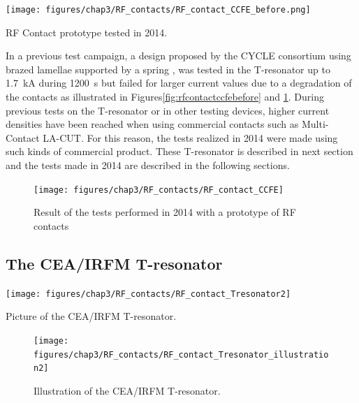 {\begin{marginfigure}[-2cm]
	\centering
	\texttt{[image: figures/chap3/RF\_contacts/RF\_contact\_CCFE\_before.png]}
	\caption{RF Contact prototype tested in 2014.}
	\label{fig:rfcontactccfebefore}
\end{marginfigure}

In a previous test campaign, a design proposed by the CYCLE consortium using brazed lamellae supported by a spring \cite{argouarch2014}, was tested in the T-resonator up to 1.7~kA during 1200~s but failed for larger current values due to a degradation of the contacts as illustrated in Figures\ref{fig:rfcontactccfebefore} and \ref{fig:rfcontactccfe}\cite{hillairet2015-1}. During previous tests on the T-resonator or in other testing devices, higher current densities have been reached when using commercial contacts such as Multi-Contact LA-CUT\cite{argouarch2013}. For this reason, the tests realized in 2014 were made using such kinds of commercial product. These T-resonator is described in next section and the tests made in 2014 are described in the following sections.

\begin{figure}[h]
	\centering
	\texttt{[image: figures/chap3/RF\_contacts/RF\_contact\_CCFE]}
	\caption{Result of the tests performed in 2014 with a prototype of RF contacts}
	\label{fig:rfcontactccfe}
\end{figure}

\clearpage
\subsection{The CEA/IRFM T-resonator}

\begin{marginfigure}
	\centering
	\texttt{[image: figures/chap3/RF\_contacts/RF\_contact\_Tresonator2]}
	\caption{Picture of the CEA/IRFM T-resonator.}
	\label{fig:rfcontacttresonator2}
\end{marginfigure}

\begin{figure}[h]
	\centering
	\texttt{[image: figures/chap3/RF\_contacts/RF\_contact\_Tresonator\_illustration2]}
	\caption{Illustration of the CEA/IRFM T-resonator.}
	\label{fig:rfcontacttresonatorillustration2}
\end{figure}

}
